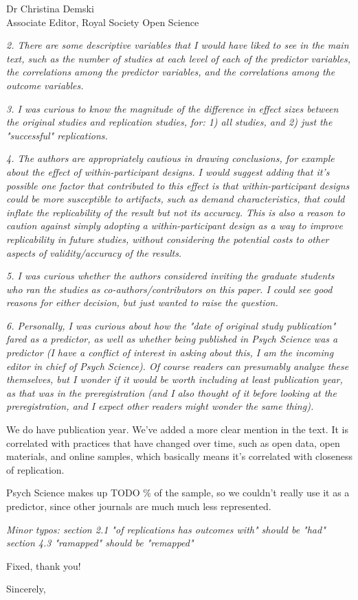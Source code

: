 \documentclass{stanfordletter}
\newcommand{\theysaid}[1]{\begin{leftbar} \noindent 
		\textsl{ #1}\end{leftbar}}
\begin{document}
\begin{letter}{Dr Christina Demski \\ Associate Editor, Royal Society Open Science}
          
          
          \theysaid{
          	2. There are some descriptive variables that I would have liked to see in the main text, such as the number of studies at each level of each of the predictor variables, the correlations among the predictor variables, and the correlations among the outcome variables.
          }
          
          \theysaid{
          	3. I was curious to know the magnitude of the difference in effect sizes between the original studies and replication studies, for: 1) all studies, and 2) just the "successful" replications.
          }
          
          \theysaid{
          	4. The authors are appropriately cautious in drawing conclusions, for example about the effect of within-participant designs.  I would suggest adding that it's possible one factor that contributed to this effect is that within-participant designs could be more susceptible to artifacts, such as demand characteristics, that could inflate the replicability of the result but not its accuracy.  This is also a reason to caution against simply adopting a within-participant design as a way to improve replicability in future studies, without considering the potential costs to other aspects of validity/accuracy of the results.
          }
          \theysaid{
          	5. I was curious whether the authors considered inviting the graduate students who ran the studies as co-authors/contributors on this paper. I could see good reasons for either decision, but just wanted to raise the question.
          }
          
          \theysaid{
          	6. Personally, I was curious about how the "date of original study publication" fared as a predictor, as well as whether being published in Psych Science was a predictor (I have a conflict of interest in asking about this, I am the incoming editor in chief of Psych Science).  Of course readers can presumably analyze these themselves, but I wonder if it would be worth including at least publication year, as that was in the preregistration (and I also thought of it before looking at the preregistration, and I expect other readers might wonder the same thing).
          }
          We do have publication year. We've added a more clear mention in the text. It is correlated with practices that have changed over time, such as open data, open materials, and online samples, which basically means it's correlated with closeness of replication. 
          
          Psych Science makes up TODO \% of the sample, so we couldn't really use it as a predictor, since other journals are much much less represented. 
          
          
          	\theysaid{
          	Minor typos:
          	section 2.1 "of replications has outcomes with" should be "had"
          	section 4.3 "ramapped" should be "remapped"
          }
          Fixed, thank you!
          
          
         
          
          \closing{Sincerely,}
		
	\end{letter}
	
\end{document}
